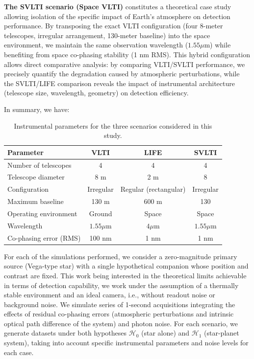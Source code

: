 \documentclass{article}
\begin{document}
\textbf{The SVLTI scenario (Space VLTI)} constitutes a theoretical case study allowing isolation of the specific impact of Earth's atmosphere on detection performance. By transposing the exact VLTI configuration (four 8-meter telescopes, irregular arrangement, 130-meter baseline) into the space environment, we maintain the same observation wavelength ($1.55\mu$m) while benefiting from space co-phasing stability (1 nm RMS). This hybrid configuration allows direct comparative analysis: by comparing VLTI/SVLTI performance, we precisely quantify the degradation caused by atmospheric perturbations, while the SVLTI/LIFE comparison reveals the impact of instrumental architecture (telescope size, wavelength, geometry) on detection efficiency.

In summary, we have:
\begin{table}[H]
\centering
\begin{tabular}{|l|c|c|c|}
\hline
\textbf{Parameter} & \textbf{VLTI} & \textbf{LIFE} & \textbf{SVLTI} \\
\hline
Number of telescopes & 4 & 4 & 4 \\
Telescope diameter & 8 m & 2 m & 8 \\
Configuration & Irregular & Regular (rectangular) & Irregular \\
Maximum baseline & 130 m & 600 m & 130 \\
Operating environment & Ground & Space & Space \\
Wavelength & $1.55\mu$m & $4\mu$m & $1.55\mu$m \\
Co-phasing error (RMS) & 100 nm & 1 nm & 1 nm \\
\hline
\end{tabular}
\caption{Instrumental parameters for the three scenarios considered in this study.}
\label{tab:scenarios}
\end{table}

For each of the simulations performed, we consider a zero-magnitude primary source (Vega-type star) with a single hypothetical companion whose position and contrast are fixed. This work being interested in the theoretical limits achievable in terms of detection capability, we work under the assumption of a thermally stable environment and an ideal camera, i.e., without readout noise or background noise. We simulate series of 1-second acquisitions integrating the effects of residual co-phasing errors (atmospheric perturbations and intrinsic optical path difference of the system) and photon noise. For each scenario, we generate datasets under both hypotheses $\mathcal{H}_0$ (star alone) and $\mathcal{H}_1$ (star-planet system), taking into account specific instrumental parameters and noise levels for each case.
\end{document}
